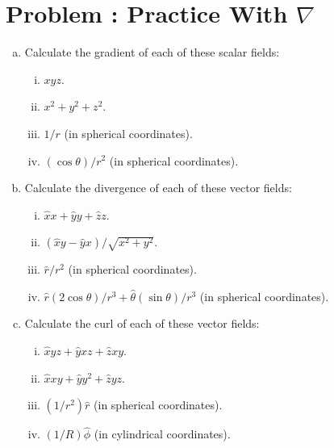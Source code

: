 \documentclass[problems]{esg8022pset}
\date{\today }
\begin{document}
\section{Problem \thesection: Practice With \texorpdfstring {$\nabla $}{∇}}
  \begin{enumerate}[(a)]
    \item Calculate the gradient of each of these scalar fields:
      \begin{enumerate}[(i)]
        \item $xyz$.
        \item $x^2 + y^2 + z^2$.
        \item $1/r$ (in spherical coordinates).
        \item $(\cos\theta) / r^2$ (in spherical coordinates).
      \end{enumerate}
    \item Calculate the divergence of each of these vector fields:
      \begin{enumerate}[(i)]
        \item $\hat{x} x + \hat{y} y + \hat{z} z$.
        \item $(\hat{x} y - \hat{y} x) / \sqrt{x^2 + y^2}$.
        \item $\hat{r}/r^2$ (in spherical coordinates).
        \item $\hat{r}(2\cos\theta)/r^3 + \hat{\theta}(\sin\theta)/r^3$ (in spherical coordinates).
      \end{enumerate}
    \item Calculate the curl of each of these vector fields:
      \begin{enumerate}[(i)]
        \item $\hat{x} yz + \hat{y} xz + \hat{z} xy$.
        \item $\hat{x} xy + \hat{y} y^2 + \hat{z} yz$.
        \item $(1/r^2)\hat{r}$ (in spherical coordinates).
        \item $(1/R)\hat{\phi}$ (in cylindrical coordinates).
      \end{enumerate}
  \end{enumerate}
\end{document}
